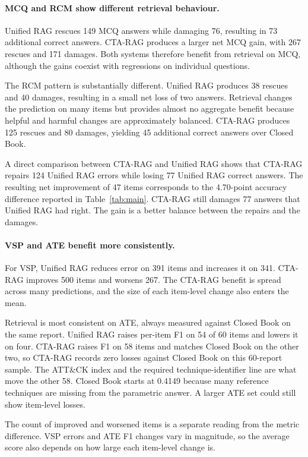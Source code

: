 \documentclass[5p,times,authoryear]{elsarticle}
\begin{document}
\paragraph{MCQ and RCM show different retrieval behaviour.}
Unified RAG rescues 149 MCQ answers while damaging 76, resulting in
73 additional correct answers. CTA-RAG produces a larger net MCQ gain,
with 267 rescues and 171 damages. Both systems therefore benefit from
retrieval on MCQ, although the gains coexist with regressions on individual
questions.

The RCM pattern is substantially different. Unified RAG produces 38 rescues
and 40 damages, resulting in a small net loss of two answers. Retrieval
changes the prediction on many items but provides almost no aggregate
benefit because helpful and harmful changes are approximately balanced.
CTA-RAG produces 125 rescues and 80 damages, yielding 45 additional correct
answers over Closed Book.

A direct comparison between CTA-RAG and Unified RAG shows that CTA-RAG
repairs 124 Unified RAG errors while losing 77 Unified RAG correct answers.
The resulting net improvement of 47 items corresponds to the 4.70-point
accuracy difference reported in Table~\ref{tab:main}. CTA-RAG still damages
77 answers that Unified RAG had right. The gain is a better balance between
the repairs and the damages.

\paragraph{VSP and ATE benefit more consistently.}
For VSP, Unified RAG reduces error on 391 items and increases it on 341.
CTA-RAG improves 500 items and worsens 267. The CTA-RAG benefit is spread across many predictions, and the size of each item-level change also enters the mean.

Retrieval is most consistent on ATE, always measured against Closed Book on the same report. Unified RAG raises per-item F1 on 54 of 60 items and lowers it on four. CTA-RAG raises F1 on 58 items and matches Closed Book on the other two, so CTA-RAG records zero losses against Closed Book on this 60-report sample. The ATT\&CK index and the required technique-identifier line are what move the other 58. Closed Book starts at 0.4149 because many reference techniques are missing from the parametric answer. A larger ATE set could still show item-level losses.

The count of improved and worsened items is a separate reading from the
metric difference. VSP errors and ATE F1 changes vary in magnitude,
so the average score also depends on how large each item-level change is.
\end{document}
